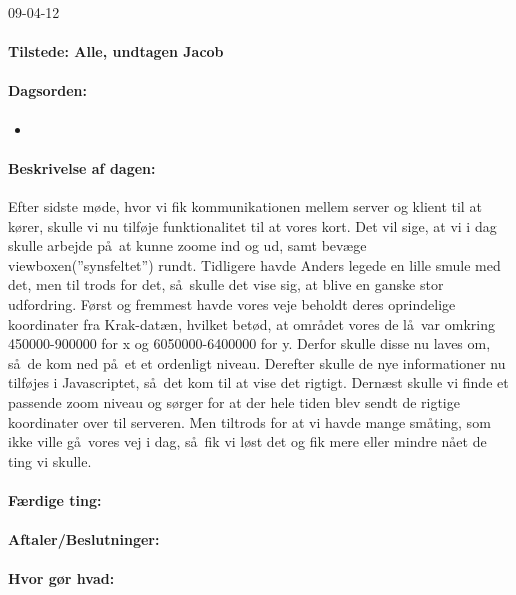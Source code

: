 \documentclass[a4paper,10pt,titlepage]{article}
\begin{document}
		\begin{center}
		09-04-12
		\end{center}
		
		\paragraph{Tilstede: Alle, undtagen Jacob}
		\paragraph{Dagsorden:}
		\begin{itemize}
					\item 
					
		\end{itemize}
		
		\paragraph{Beskrivelse af dagen:}
		Efter sidste m\o de, hvor vi fik kommunikationen mellem server og klient til at k\o rer, skulle vi nu tilf\o je funktionalitet til at vores kort. Det vil sige, at vi i dag skulle arbejde p\aa \ at kunne zoome ind og ud, samt bev\ae ge viewboxen(”synsfeltet”) rundt. Tidligere havde Anders legede en lille smule med det, men til trods for det, s\aa \ skulle det vise sig, at blive en ganske stor udfordring. F\o rst og fremmest havde vores veje beholdt deres oprindelige koordinater fra Krak-dat\ae n, hvilket bet\o d, at omr\aa det vores de l\aa \ var omkring 450000-900000 for x og 6050000-6400000 for y. Derfor skulle disse nu laves om, s\aa \ de kom ned p\aa \ et et ordenligt niveau. Derefter skulle de nye informationer nu tilf\o jes i Javascriptet, s\aa \ det kom til at vise det rigtigt. Dern\ae st skulle vi finde et passende zoom niveau og s\o rger for at der hele tiden blev sendt de rigtige koordinater over til serveren. Men tiltrods for at vi havde mange sm\aa ting, som ikke ville g\aa \ vores vej i dag, s\aa \ fik vi l\o st det og fik mere eller mindre n\aa et de ting vi skulle. 
		\paragraph{F\ae rdige ting:}
		
		\paragraph{Aftaler/Beslutninger:}
		
		\paragraph{Hvor g\o r hvad:}
		
\end{document}
